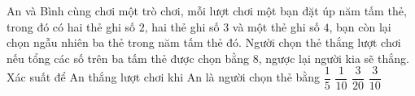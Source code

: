 \begin{ex}%
	An và Bình cùng chơi một trò chơi, mỗi lượt chơi một bạn đặt úp năm tấm thẻ, trong đó có hai thẻ ghi số $2$, hai thẻ ghi số $3$ và một thẻ ghi số $4$, bạn còn lại chọn ngẫu nhiên ba thẻ trong năm tấm thẻ đó. Người chọn thẻ thắng lượt chơi nếu tổng các số trên ba tấm thẻ được chọn bằng $8$, ngược lại người kia sẽ thắng. Xác suất để An thắng lượt chơi khi An là người chọn thẻ bằng
	\choice
	{$\dfrac{1}{5}$}
	{$\dfrac{1}{10}$}
	{$\dfrac{3}{20}$}
	{\True $\dfrac{3}{10}$}
\end{ex}


